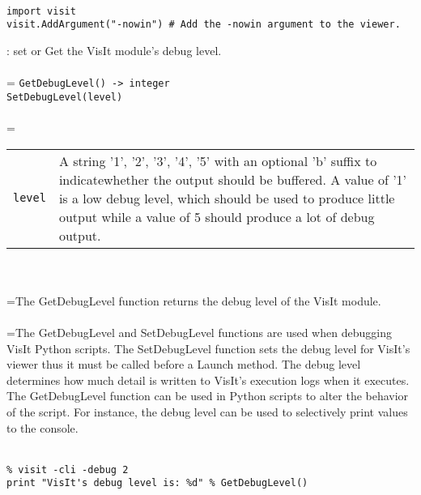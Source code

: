 \documentclass[10pt,a4paper]{report}
\begin{document}
\\[-6mm]
\begin{verbatim}import visit
visit.AddArgument("-nowin") # Add the -nowin argument to the viewer.
\end{verbatim}
\newpage


{}
: set or Get the VisIt module's debug level.\\[-3mm]

 \\ 
\hangindent=\parindent 
\verb!GetDebugLevel() -> integer!\\ 
\verb!SetDebugLevel(level)!\\ [-3mm]

 \\ 
\hangindent=\parindent 
\begin{tabular}{lp{9cm}}
\verb!level! & A string '1', '2', '3', '4', '5' with an optional 'b' suffix to indicatewhether the output should be buffered. A value of '1' is a low debug level, which should be used to produce little output while a value of 5 should produce a lot of debug output. \\
\end{tabular} \\[-2mm]


 \\ 
\hangindent=\parindent The GetDebugLevel function returns the debug level of the VisIt module. \\[-3mm] 

 \\ 
\hangindent=\parindent The GetDebugLevel and SetDebugLevel functions are used when debugging VisIt Python scripts. The SetDebugLevel function sets the debug level for VisIt's viewer thus it must be called before a Launch method. The debug level determines how much detail is written to VisIt's execution logs when it executes. The GetDebugLevel function can be used in Python scripts to alter the behavior of the script. For instance, the debug level can be used to selectively print values to the console. \\[-3mm] 

\\[-6mm]
\begin{verbatim}% visit -cli -debug 2
print "VisIt's debug level is: %d" % GetDebugLevel()
\end{verbatim}
\newpage
\end{document}
